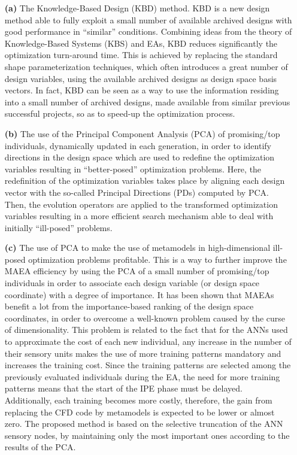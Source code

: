 \begin{itemize}

\item[\textbf{(a)}] The Knowledge-Based Design (KBD) method. KBD is a new design method able to fully exploit a small number of available archived designs with good performance in ``similar” conditions.  Combining ideas from the theory of Knowledge-Based Systems (KBS) and EAs, KBD reduces significantly the optimization turn-around time. This is achieved by replacing the standard shape parameterization techniques, which often introduces a great number of design variables,  using the available archived designs as design space basis vectors.  In fact, KBD can be seen as a way to use the information residing into a small number of archived designs, made available from similar previous successful projects, so as to speed-up the optimization process. 
 
\item[\textbf{(b)}] The use of the Principal Component Analysis (PCA) of promising/top individuals, dynamically updated in each generation, in order to identify directions in the design space which are used to redefine the optimization variables resulting in  ``better-posed'' optimization problems.  Here, the redefinition of the optimization variables takes place by aligning each design vector with the so-called Principal Directions (PDs) computed by PCA.  Then, the evolution operators are applied to the transformed optimization variables resulting in a more efficient search mechanism able to deal with initially ``ill-posed'' problems. 
 
\item[\textbf{(c)}] The use of PCA to make the use of metamodels in high-dimensional ill-posed optimization problems profitable. This is a way to further improve the MAEA efficiency by using the PCA of a small number of promising/top individuals in order to associate each design variable (or design space coordinate) with a degree of importance. It has been shown that MAEAs  benefit a lot from the importance-based ranking of the design space coordinates, in order to overcome a well-known problem caused by the curse of dimensionality. This problem is related to the fact that for the ANNs used to approximate the cost of each new individual, any increase in the number of their sensory units makes the use of more training patterns mandatory and increases the training cost.  Since the training patterns are selected among the previously evaluated individuals during the EA, the need for more training patterns means that the start of the IPE phase must be delayed. Additionally, each training becomes more costly, therefore, the gain from replacing the CFD code by metamodels is expected to be lower or almost zero. The proposed method is based on the selective truncation of the ANN sensory nodes, by maintaining only the most important ones according to the results of the PCA. 
  

\end{itemize}

